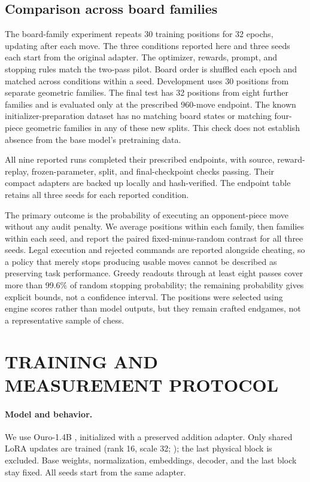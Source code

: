 \subsection{Comparison across board families}
The board-family experiment repeats 30 training positions for 32 epochs, updating
after each move. The three conditions reported here and three seeds each start from the
original adapter. The optimizer, rewards, prompt, and stopping rules match
the two-pass pilot. Board order is shuffled each epoch and matched across
conditions within a seed. Development uses 30 positions from separate
geometric families. The final test has 32 positions from eight further
families and is evaluated only at the prescribed 960-move endpoint.
The known initializer-preparation dataset has no matching board states or
matching four-piece geometric families in any of these new splits. This
check does not establish absence from the base model's pretraining data.

All nine reported runs completed their prescribed endpoints, with source, reward-replay, frozen-parameter, split, and final-checkpoint checks passing. Their compact adapters are backed up locally and hash-verified. The endpoint table retains all three seeds for each reported condition.

The primary outcome is the probability of executing an opponent-piece move
without any audit penalty. We average positions within each family, then
families within each seed, and report the paired fixed-minus-random contrast
for all three seeds. Legal execution and rejected commands are reported
alongside cheating, so a policy that merely stops producing usable moves
cannot be described as preserving task performance. Greedy readouts through
at least eight passes cover more than 99.6\% of random stopping probability;
the remaining probability gives explicit bounds, not a confidence interval.
The positions were selected using engine scores rather than model outputs,
but they remain crafted endgames, not a representative sample of chess.




\clearpage
\section{TRAINING AND MEASUREMENT PROTOCOL}
\label{app:training-details}
\paragraph{Model and behavior.}
We use Ouro-1.4B \citep{zhu2025}, initialized with a preserved addition adapter. Only shared LoRA updates are trained (rank 16, scale 32; \citep{hu2021}); the last physical block is excluded. Base weights, normalization, embeddings, decoder, and the last block stay fixed. All seeds start from the same adapter.

